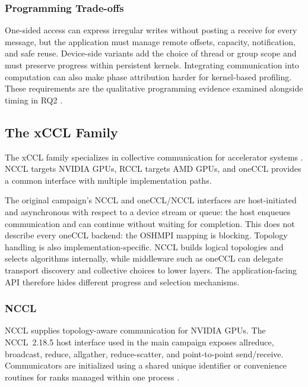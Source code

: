 \subsubsection{Programming Trade-offs}

One-sided access can express irregular writes without posting a receive for every message, but the application must manage remote offsets, capacity, notification, and safe reuse. Device-side variants add the choice of thread or group scope and must preserve progress within persistent kernels. Integrating communication into computation can also make phase attribution harder for kernel-based profiling. These requirements are the qualitative programming evidence examined alongside timing in RQ2 \cite{unat_landscape_2026,trotter_cpu-_2025}.

\subsection{The xCCL Family}\label{sec:xccl}

The xCCL family specializes in collective communication for accelerator systems \cite{weingram_xccl_2023}. NCCL targets NVIDIA GPUs, RCCL targets AMD GPUs, and oneCCL provides a common interface with multiple implementation paths.

The original campaign's NCCL and oneCCL/NCCL interfaces are host-initiated and asynchronous with respect to a device stream or queue: the host enqueues communication and can continue without waiting for completion. This does not describe every oneCCL backend: the OSHMPI mapping is blocking. Topology handling is also implementation-specific. NCCL builds logical topologies and selects algorithms internally, while middleware such as oneCCL can delegate transport discovery and collective choices to lower layers. The application-facing API therefore hides different progress and selection mechanisms.

\subsubsection{NCCL}\label{sec:nccl}
NCCL \cite{nvidia_nccl_repo} supplies topology-aware communication for NVIDIA GPUs. The NCCL~2.18.5 host interface used in the main campaign exposes allreduce, broadcast, reduce, allgather, reduce-scatter, and point-to-point send/receive. Communicators are initialized using a shared unique identifier or convenience routines for ranks managed within one process \cite{hu_demystifying_2025}.

